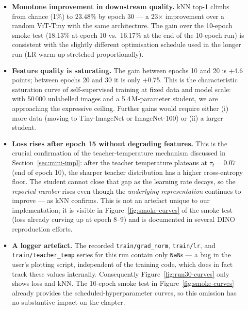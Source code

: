\documentclass[11pt,a4paper]{article}
\begin{document}
\begin{itemize}[leftmargin=*]
\item \textbf{Monotone improvement in downstream quality.} kNN top-1
climbs from chance (1\%) to 23.48\% by epoch 30 --- a 23$\times$
improvement over a random ViT-Tiny with the same architecture. The gain
over the 10-epoch smoke test (18.13\% at epoch 10 vs.\ 16.17\% at the
end of the 10-epoch run) is consistent with the slightly different
optimisation schedule used in the longer run (LR warm-up stretched
proportionally).

\item \textbf{Feature quality is saturating.} The gain between
epochs 10 and 20 is +4.6 points; between epochs 20 and 30 it is only
+0.75. This is the characteristic saturation curve of self-supervised
training at fixed data and model scale: with 50\,000 unlabelled images
and a 5.4\,M-parameter student, we are approaching the expressive
ceiling. Further gains would require either (i) more data (moving to
Tiny-ImageNet or ImageNet-100) or (ii) a larger student.

\item \textbf{Loss rises after epoch 15 without degrading features.}
This is the crucial confirmation of the teacher-temperature mechanism
discussed in Section~\ref{sec:mini-impl}: after the teacher temperature
plateaus at $\tau_t = 0.07$ (end of epoch 10), the sharper teacher
distribution has a higher cross-entropy floor. The student cannot close
that gap as the learning rate decays, so the \emph{reported number} rises
even though the \emph{underlying representation} continues to improve ---
as kNN confirms. This is not an artefact unique to our implementation;
it is visible in Figure~\ref{fig:smoke-curves} of the smoke test
(loss already curving up at epoch 8--9) and is documented in several
DINO reproduction efforts.

\item \textbf{A logger artefact.} The recorded
\texttt{train/grad\_norm}, \texttt{train/lr}, and
\texttt{train/teacher\_temp} series for this run contain only
\texttt{NaN}s --- a bug in the user's plotting script, independent of
the training code, which does in fact track these values internally.
Consequently Figure~\ref{fig:run30-curves} only shows loss and kNN.
The 10-epoch smoke test in Figure~\ref{fig:smoke-curves} already
provides the scheduled-hyperparameter curves, so this omission has no
substantive impact on the chapter.
\end{itemize}
\end{document}
